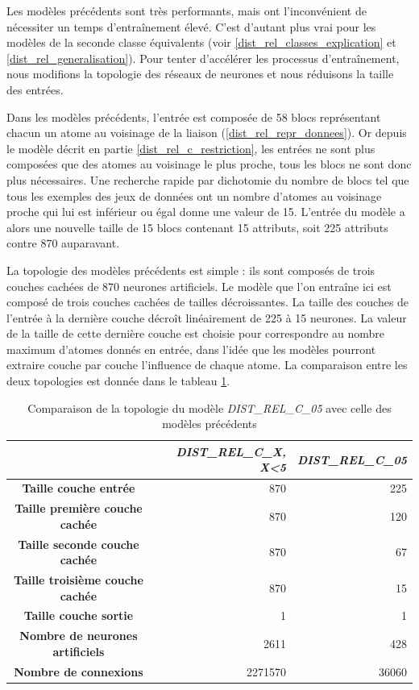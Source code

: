 \label{dist_rel_c_reduc_largeur}
\par Les modèles précédents sont très performants, mais ont l'inconvénient de nécessiter un temps d'entraînement élevé. C'est d'autant plus vrai pour les modèles de la seconde classe équivalents (voir \ref{dist_rel_classes_explication} et \ref{dist_rel_generalisation}). Pour tenter d'accélérer les processus d'entraînement, nous modifions la topologie des réseaux de neurones et nous réduisons la taille des entrées.
\par Dans les modèles précédents, l'entrée est composée de 58 blocs représentant chacun un atome au voisinage de la liaison (\ref{dist_rel_repr_donnees}). Or depuis le modèle décrit en partie \ref{dist_rel_c_restriction}, les entrées ne sont plus composées que des atomes au voisinage le plus proche, tous les blocs ne sont donc plus nécessaires. Une recherche rapide par dichotomie du nombre de blocs tel que tous les exemples des jeux de données ont un nombre d'atomes au voisinage proche qui lui est inférieur ou égal donne une valeur de 15. L'entrée du modèle a alors une nouvelle taille de 15 blocs contenant 15 attributs, soit 225 attributs contre 870 auparavant.
\par La topologie des modèles précédents est simple : ils sont composés de trois couches cachées de 870 neurones artificiels. Le modèle que l'on entraîne ici est composé de trois couches cachées de tailles décroissantes. La taille des couches de l'entrée à la dernière couche décroît linéairement de 225 à 15 neurones. La valeur de la taille de cette dernière couche est choisie pour correspondre au nombre maximum d'atomes donnés en entrée, dans l'idée que les modèles pourront extraire couche par couche l'influence de chaque atome. La comparaison entre les deux topologies est donnée dans le tableau \ref{tparams_dist_rel_c_05}.

\begin{table}
	\centering
	\begin{tabular}{|c|r|r|}
		\hline
		& \textbf{\emph{DIST\_REL\_C\_X, X<5}} & \textbf{\emph{DIST\_REL\_C\_05}}\\ \hline
		\textbf{Taille couche entrée} & 870 & 225 \\ \hline
		\textbf{Taille première couche cachée} & 870 & 120\\ \hline
		\textbf{Taille seconde couche cachée} & 870 & 67\\ \hline
		\textbf{Taille troisième couche cachée} & 870 & 15\\ \hline
		\textbf{Taille couche sortie} & 1 & 1\\ \hline
		\textbf{Nombre de neurones artificiels} & 2611 & 428\\ \hline
		\textbf{Nombre de connexions} & 2271570 & 36060 \\ \hline
	\end{tabular}
	
	\caption{Comparaison de la topologie du modèle \emph{DIST\_REL\_C\_05} avec celle des modèles précédents}
	\label{tparams_dist_rel_c_05}
\end{table}

